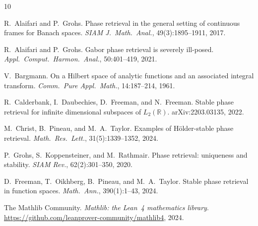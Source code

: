 \documentclass[11pt]{amsart}
\theoremstyle{definition}
\theoremstyle{remark}
\begin{document}
\begin{thebibliography}{10}

R.~Alaifari and P.~Grohs.
\newblock Phase retrieval in the general setting of continuous frames for
  {B}anach spaces.
\newblock \emph{SIAM J.\ Math.\ Anal.}, 49(3):1895--1911, 2017.

R.~Alaifari and P.~Grohs.
\newblock Gabor phase retrieval is severely ill-posed.
\newblock \emph{Appl.\ Comput.\ Harmon.\ Anal.}, 50:401--419, 2021.

V.~Bargmann.
\newblock On a {H}ilbert space of analytic functions and an associated integral
  transform.
\newblock \emph{Comm.\ Pure Appl.\ Math.}, 14:187--214, 1961.

R.~Calderbank, I.~Daubechies, D.~Freeman, and N.~Freeman.
\newblock Stable phase retrieval for infinite dimensional subspaces of
  $L_2(\mathbb{R})$.
\newblock arXiv:2203.03135, 2022.

M.~Christ, B.~Pineau, and M.~A.~Taylor.
\newblock Examples of {H}\"older-stable phase retrieval.
\newblock \emph{Math.\ Res.\ Lett.}, 31(5):1339--1352, 2024.

P.~Grohs, S.~Koppensteiner, and M.~Rathmair.
\newblock Phase retrieval: uniqueness and stability.
\newblock \emph{SIAM Rev.}, 62(2):301--350, 2020.

D.~Freeman, T.~Oikhberg, B.~Pineau, and M.~A.~Taylor.
\newblock Stable phase retrieval in function spaces.
\newblock \emph{Math.\ Ann.}, 390(1):1--43, 2024.

The Mathlib Community.
\newblock \emph{Mathlib: the Lean~4 mathematics library}.
\newblock \url{https://github.com/leanprover-community/mathlib4}, 2024.

\end{thebibliography}
\end{document}
